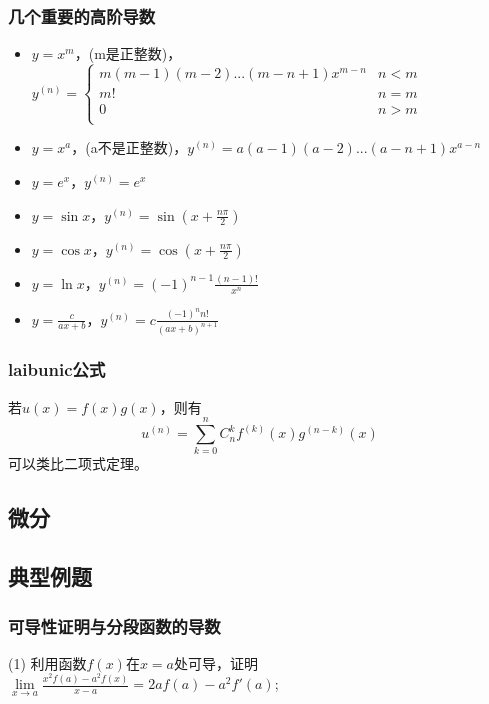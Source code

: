 \documentclass[12pt , a4paper , oneside]{ctexart}
\begin{document}
            \subsubsection{几个重要的高阶导数}
            \begin{itemize}
                \item $y = x^m$，(m是正整数)，$y^{(n)} = \begin{cases}
                    m(m-1)(m-2)...(m-n+1)x^{m-n} & n < m\\
                    m! & n = m\\
                    0 & n > m\\
                \end{cases}$
                \item $y = x^a$，(a不是正整数)，$y^{(n)} = a(a-1)(a-2)...(a-n+1)x^{a-n}$
                \item $y = e^x$，$y^{(n)} = e^x$
                \item $y = \sin x$，$y^{(n)} = \sin(x + \frac{n\pi}{2})$
                \item $y = \cos x$，$y^{(n)} = \cos(x + \frac{n\pi}{2})$
                \item $y = \ln x$，$y^{(n)} = (-1)^{n-1} \frac{(n-1)!}{x^n}$
                \item $y = \frac{c}{ax+b}$，$y^{(n)} = c \frac{(-1)^n n!} {(ax+b)^{n+1}}$
            \end{itemize}
            \subsubsection{laibunic公式}
            若$u(x) = f(x)g(x)$，则有
            $$u^{(n)} = \sum\limits_{k=0}^{n} C_n^k f^{(k)}(x)g^{(n-k)}(x)$$
            可以类比二项式定理。
        \subsection{微分}

        \subsection{典型例题}
            \subsubsection{可导性证明与分段函数的导数}
            (1) 利用函数$f(x)$在$x=a$处可导，证明$\lim\limits_{x \to a} \frac{x^2 f(a)-a^2f(x)}
            {x-a}=2af(a)-a^2 f'(a)$;
\end{document}
